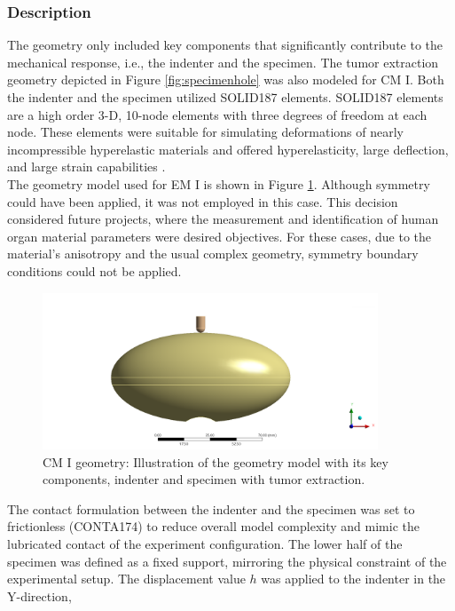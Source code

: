 \subsubsection*{Description}
The geometry only included key components that significantly contribute to the mechanical response,
i.e., the indenter and the specimen. The tumor extraction geometry depicted in Figure \ref{fig:specimenhole}
was also modeled for CM I. Both the indenter and the specimen utilized SOLID187 elements.
SOLID187 elements are a high order 3-D, \SI{10}{}-node elements with three degrees of freedom at each node.
These elements were suitable for simulating deformations of nearly incompressible hyperelastic materials 
and offered hyperelasticity, large deflection, and large strain capabilities \cite{Ansys2010}.\\
The geometry model used for EM I is shown in Figure \ref{fig:geometrycpI}. %
Although symmetry could have been applied, it was not employed in this case. This decision considered 
future projects, where the measurement and identification of human organ material parameters were desired 
objectives. For these cases, due to the material's anisotropy and the usual complex geometry,
symmetry boundary conditions could not be applied. 
\begin{figure}%
    \centering
   \quad
   \includegraphics[width=10cm]{Images/computational/Assemblynoplatform2.png}%
   \caption[Computational model I geometry]{CM I geometry: Illustration of the geometry model with its key components, indenter and specimen with tumor extraction.}%
   \label{fig:geometrycpI}%
\end{figure}
The contact formulation between the indenter and the specimen was set to frictionless (CONTA174) to reduce
overall model complexity and mimic the lubricated contact of the experiment configuration.
The lower half of the specimen was defined as a fixed support, mirroring the physical constraint of the 
experimental setup. The displacement value $h$ was applied to the indenter in the Y-direction,
